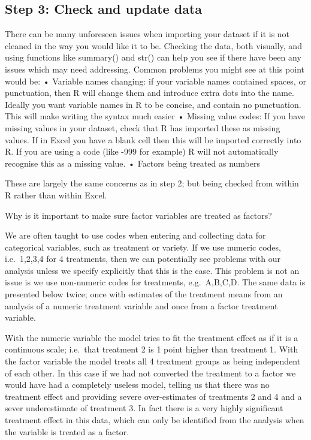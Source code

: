 \documentclass[]{book}
\theoremstyle{definition}
\theoremstyle{definition}
\theoremstyle{definition}
\theoremstyle{remark}
\begin{document}
\subsection{Step 3: Check and update
data}\label{step-3-check-and-update-data-1}

There can be many unforeseen issues when importing your dataset if it is
not cleaned in the way you would like it to be. Checking the data, both
visually, and using functions like summary() and str() can help you see
if there have been any issues which may need addressing. Common problems
you might see at this point would be: • Variable names changing: if your
variable names contained spaces, or punctuation, then R will change them
and introduce extra dots into the name. Ideally you want variable names
in R to be concise, and contain no punctuation. This will make writing
the syntax much easier • Missing value codes: If you have missing values
in your dataset, check that R has imported these as missing values. If
in Excel you have a blank cell then this will be imported correctly into
R. If you are using a code (like -999 for example) R will not
automatically recognise this as a missing value. • Factors being treated
as numbers

These are largely the same concerns as in step 2; but being checked from
within R rather than within Excel.

Why is it important to make sure factor variables are treated as
factors?

We are often taught to use codes when entering and collecting data for
categorical variables, such as treatment or variety. If we use numeric
codes, i.e.~1,2,3,4 for 4 treatments, then we can potentially see
problems with our analysis unless we specify explicitly that this is the
case. This problem is not an issue is we use non-numeric codes for
treatments, e.g.~A,B,C,D. The same data is presented below twice; once
with estimates of the treatment means from an analysis of a numeric
treatment variable and once from a factor treatment variable.

With the numeric variable the model tries to fit the treatment effect as
if it is a continuous scale; i.e.~that treatment 2 is 1 point higher
than treatment 1. With the factor variable the model treats all 4
treatment groups as being independent of each other. In this case if we
had not converted the treatment to a factor we would have had a
completely useless model, telling us that there was no treatment effect
and providing severe over-estimates of treatments 2 and 4 and a sever
underestimate of treatment 3. In fact there is a very highly significant
treatment effect in this data, which can only be identified from the
analysis when the variable is treated as a factor.
\end{document}
